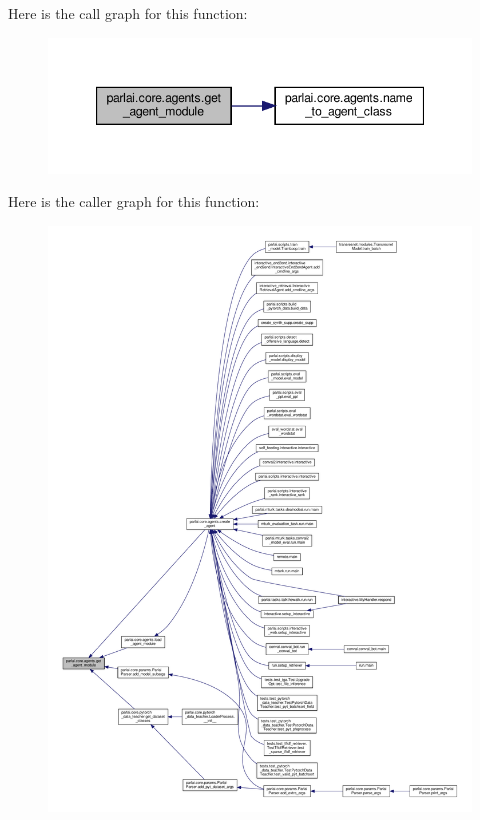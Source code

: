 Here is the call graph for this function\+:
\nopagebreak
\begin{figure}[H]
\begin{center}
\leavevmode
\includegraphics[width=347pt]{namespaceparlai_1_1core_1_1agents_a14a9d134d76ffd0509e50703d0f2c949_cgraph}
\end{center}
\end{figure}
Here is the caller graph for this function\+:
\nopagebreak
\begin{figure}[H]
\begin{center}
\leavevmode
\includegraphics[width=350pt]{namespaceparlai_1_1core_1_1agents_a14a9d134d76ffd0509e50703d0f2c949_icgraph}
\end{center}
\end{figure}
\mbox{\label{namespaceparlai_1_1core_1_1agents_a530b987b67a802a8e9c5fa3c24ae942f}} 
